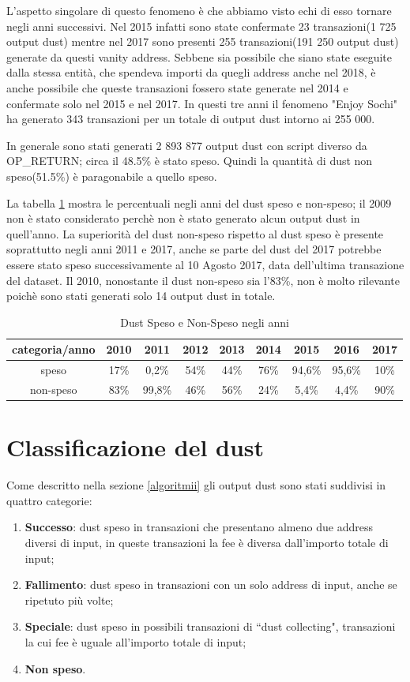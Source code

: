 L'aspetto singolare di questo fenomeno è che abbiamo visto echi di esso tornare negli anni successivi. Nel 2015 infatti sono state confermate 23 transazioni(1 725 output dust) mentre nel 2017 sono presenti 255 transazioni(191 250 output dust) generate da questi vanity address. Sebbene sia possibile che siano state eseguite dalla stessa entità, che spendeva importi da quegli address anche nel 2018, è anche possibile che queste transazioni fossero state generate nel 2014 e confermate solo nel 2015 e nel 2017. In questi tre anni il fenomeno "Enjoy Sochi" ha generato 343 transazioni per un totale di output dust intorno ai 255 000.

In generale sono stati generati 2 893 877 output dust con script diverso da OP\_RETURN; circa il 48.5\% è stato speso. Quindi la quantità di dust non speso(51.5\%) è paragonabile a quello speso. 

La tabella \ref{tab:dust_spent_unspent} mostra le percentuali negli anni del dust speso e non-speso; il 2009 non è stato considerato perchè non è stato generato alcun output dust in quell'anno. La superiorità del dust non-speso rispetto al dust speso è presente soprattutto negli anni 2011 e 2017, anche se parte del dust del 2017 potrebbe essere stato speso successivamente al 10 Agosto 2017, data dell'ultima transazione del dataset. Il 2010, nonostante il dust non-speso sia l'83\%, non è molto rilevante poichè sono stati generati solo 14 output dust in totale. 
\begin{table}[H]
    \centering
    \begin{tabular}{|c|c|c|c|c|c|c|c|c|}
        \hline
           categoria/anno   & 2010 & 2011 & 2012 & 2013 & 2014 & 2015 & 2016 & 2017\\
        \hline 
         speso &  17\% & 0,2\% & 54\% & 44\% & 76\% & 94,6\% & 95,6\% & 10\% \\
         \hline
         non-speso & 83\% & 99,8\% & 46\% & 56\% & 24\% & 5,4\% & 4,4\% & 90\%  \\
         \hline
    \end{tabular}
    \caption{Dust Speso e Non-Speso negli anni}
    \label{tab:dust_spent_unspent}
\end{table}
\section{Classificazione del dust}
Come descritto nella sezione \ref{algoritmii} gli output dust sono stati suddivisi in quattro categorie:
\begin{enumerate}
    \item \textbf{Successo}: dust speso in transazioni che presentano almeno due address diversi di input, in queste transazioni la fee è diversa dall'importo totale di input;
    \item \textbf{Fallimento}: dust speso in transazioni con un solo address di input, anche se ripetuto più volte;
    \item \textbf{Speciale}: dust speso in possibili transazioni di ``dust collecting", transazioni la cui fee è uguale all'importo totale di input;
    \item \textbf{Non speso}.
\end{enumerate}

